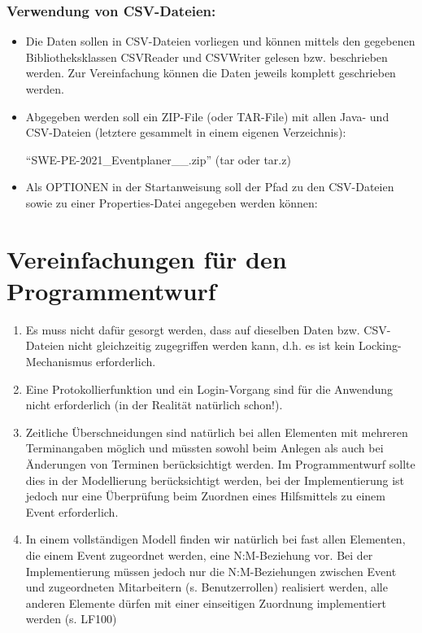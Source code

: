 \subsubsection*{Verwendung von CSV-Dateien:}
\begin{itemize}
    \item Die Daten sollen in CSV-Dateien vorliegen und können mittels den gegebenen Bibliotheksklassen CSVReader und CSVWriter gelesen bzw. beschrieben werden. Zur Vereinfachung können die Daten jeweils komplett geschrieben werden. 
    \item Abgegeben werden soll ein ZIP-File (oder TAR-File) mit allen Java- und CSV-Dateien (letztere gesammelt in einem eigenen Verzeichnis): 
    
    \enquote{SWE-PE-2021\_Eventplaner\_<n1>\_<n2>.zip} (tar oder tar.z) 
    \item Als OPTIONEN in der Startanweisung soll der Pfad zu den CSV-Dateien sowie zu einer Properties-Datei angegeben werden können: 
    
\end{itemize}
\section{Vereinfachungen für den Programmentwurf}
\begin{enumerate}
    \item Es muss nicht dafür gesorgt werden, dass auf dieselben Daten bzw. CSV-Dateien nicht gleichzeitig zugegriffen werden kann, d.h. es ist kein Locking-Mechanismus erforderlich. 
    \item Eine Protokollierfunktion und ein Login-Vorgang sind für die Anwendung nicht erforderlich (in der Realität natürlich schon!).
    \item Zeitliche Überschneidungen sind natürlich bei allen Elementen mit mehreren Terminangaben möglich und müssten sowohl beim Anlegen als auch bei Änderungen von Terminen berücksichtigt werden. Im Programmentwurf sollte dies in der Modellierung berücksichtigt werden, bei der Implementierung ist jedoch nur eine Überprüfung beim Zuordnen eines Hilfsmittels zu einem Event erforderlich.
    \item In einem vollständigen Modell finden wir natürlich bei fast allen Elementen, die einem Event zugeordnet werden, eine N:M-Beziehung vor. Bei der Implementierung müssen jedoch nur die N:M-Beziehungen zwischen Event und zugeordneten Mitarbeitern (s. Benutzerrollen) realisiert werden, alle anderen Elemente dürfen mit einer einseitigen Zuordnung implementiert werden (s. LF100)
\end{enumerate}